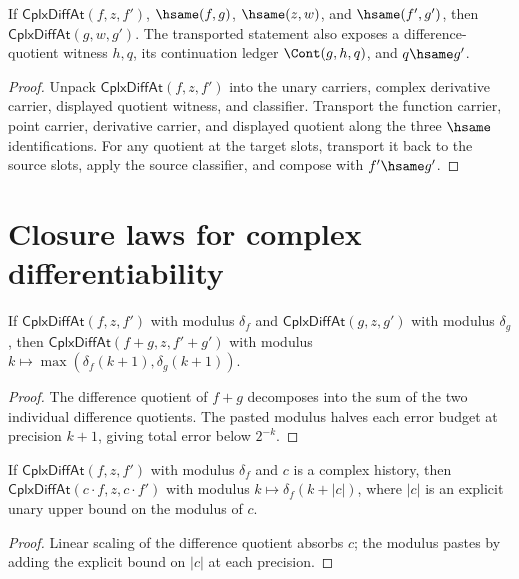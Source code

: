 \begin{lemma}
\label{lem:cplx-diff-at-full-hsame-transport}
If $\mathsf{CplxDiffAt}(f,z,f')$, $\hsame(f,g)$, $\hsame(z,w)$,
and $\hsame(f',g')$, then $\mathsf{CplxDiffAt}(g,w,g')$. The transported
statement also exposes a difference-quotient witness $h,q$, its continuation
ledger $\Cont(g,h,q)$, and $q\hsame g'$.
\end{lemma}
\begin{proof}
Unpack $\mathsf{CplxDiffAt}(f,z,f')$ into the unary carriers, complex
derivative carrier, displayed quotient witness, and classifier. Transport the
function carrier, point carrier, derivative carrier, and displayed quotient
along the three $\hsame$ identifications. For any quotient at the target
slots, transport it back to the source slots, apply the source classifier, and
compose with $f'\hsame g'$.
\end{proof}

\section{Closure laws for complex differentiability}

\begin{lemma}
\label{lem:cplx-diff-sum}
If \(\mathsf{CplxDiffAt}(f, z, f')\) with modulus \(\delta_f\) and \(\mathsf{CplxDiffAt}(g, z, g')\) with modulus \(\delta_g\), then \(\mathsf{CplxDiffAt}(f + g, z, f' + g')\) with modulus \(k \mapsto \max(\delta_f(k+1), \delta_g(k+1))\).
\end{lemma}
\begin{proof}
The difference quotient of \(f + g\) decomposes into the sum of the two individual difference quotients. The pasted modulus halves each error budget at precision \(k+1\), giving total error below \(2^{-k}\).
\end{proof}

\begin{lemma}
\label{lem:cplx-diff-scalar}
If \(\mathsf{CplxDiffAt}(f, z, f')\) with modulus \(\delta_f\) and \(c\) is a complex history, then \(\mathsf{CplxDiffAt}(c \cdot f, z, c \cdot f')\) with modulus \(k \mapsto \delta_f(k + |c|)\), where \(|c|\) is an explicit unary upper bound on the modulus of \(c\).
\end{lemma}
\begin{proof}
Linear scaling of the difference quotient absorbs \(c\); the modulus pastes by adding the explicit bound on \(|c|\) at each precision.
\end{proof}

